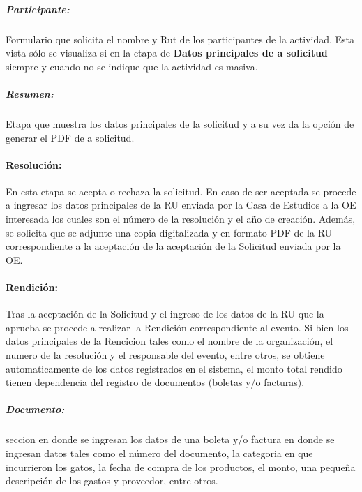     \subparagraph{Participante: } Formulario que solicita el nombre y Rut de los participantes de la actividad. Esta vista sólo se visualiza si en la etapa de \textbf{Datos principales de a solicitud} siempre y cuando no se indique que la actividad es masiva. 

    \subparagraph{Resumen: } Etapa que muestra los datos principales de la solicitud y a su vez da la opción de generar el PDF de a solicitud.

    \paragraph{Resolución: } En esta etapa se acepta o rechaza la solicitud. En caso de ser aceptada se procede a ingresar los datos principales de la RU enviada por la Casa de Estudios a la OE interesada los cuales son el número de la resolución y el año de creación. Además, se solicita que se adjunte una copia digitalizada y en formato PDF de la RU correspondiente a la aceptación de la aceptación de la Solicitud enviada por la OE.

\paragraph{Rendición: } Tras la aceptación de la Solicitud y el ingreso de los datos de la RU que la aprueba se procede a realizar la Rendición correspondiente al evento. Si bien los datos principales de la Rencicion tales como el nombre de la organización, el numero de la resolución y el responsable del evento, entre otros, se obtiene automaticamente de los datos registrados en el sistema, el monto total rendido tienen dependencia del registro de documentos (boletas y/o facturas).

    \subparagraph{Documento: } seccion en donde se ingresan los datos de una boleta y/o factura en donde se ingresan datos tales como el número del documento, la categoria en que incurrieron los gatos, la fecha de compra de los productos, el monto, una pequeña descripción de los gastos y proveedor, entre otros.



